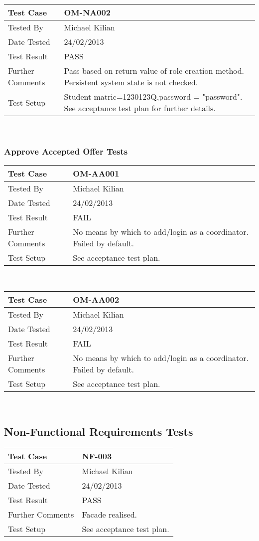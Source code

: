\documentclass{l3deliverable}
\begin{document}
\begin{tabular}{lp{10cm}}
\hline 
\textbf{Test Case} & OM-NA002\tabularnewline
\hline 
\hline 
Tested By & Michael Kilian\tabularnewline
\hline 
Date Tested & 24/02/2013\tabularnewline
\hline 
Test Result & PASS\tabularnewline
\hline
Further Comments & Pass based on return value of role creation method. Persistent system state is not checked. \tabularnewline
\hline
Test Setup & Student matric=1230123Q,password = "password". See acceptance test plan for further details.\tabularnewline
\hline
\end{tabular}\\

\subsubsection{Approve Accepted Offer Tests}
\begin{tabular}{lp{10cm}}
\hline 
\textbf{Test Case} & OM-AA001\tabularnewline
\hline 
\hline 
Tested By & Michael Kilian\tabularnewline
\hline 
Date Tested & 24/02/2013\tabularnewline
\hline 
Test Result & FAIL\tabularnewline
\hline
Further Comments & No means by which to add/login as a coordinator. Failed by default.\tabularnewline
\hline
Test Setup & See acceptance test plan.\tabularnewline
\hline
\end{tabular}\\

\begin{tabular}{lp{10cm}}
\hline 
\textbf{Test Case} & OM-AA002\tabularnewline
\hline 
\hline 
Tested By & Michael Kilian\tabularnewline
\hline 
Date Tested & 24/02/2013\tabularnewline
\hline 
Test Result & FAIL\tabularnewline
\hline
Further Comments & No means by which to add/login as a coordinator. Failed by default.\tabularnewline
\hline
Test Setup & See acceptance test plan.\tabularnewline
\hline
\end{tabular}\\

\newpage 

\subsection{Non-Functional Requirements Tests}
\begin{tabular}{lp{10cm}}
\hline 
\textbf{Test Case} & NF-003\tabularnewline
\hline 
\hline 
Tested By & Michael Kilian\tabularnewline
\hline 
Date Tested & 24/02/2013\tabularnewline
\hline 
Test Result & PASS\tabularnewline
\hline
Further Comments & Facade realised.\tabularnewline
\hline
Test Setup & See acceptance test plan.\tabularnewline
\hline
\end{tabular}\\
\end{document}
